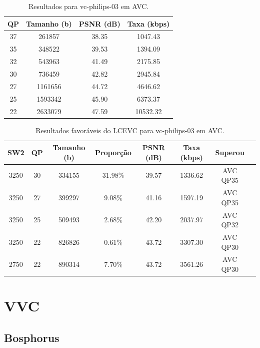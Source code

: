 \begin{table}[h]
    \centering
    \begin{tabular}{|c|c|c|c|}
        \hline
        \textbf{QP} & \textbf{Tamanho (b)} & \textbf{PSNR (dB)} & \textbf{Taxa (kbps)} \\
        \hline
        37 & 261857 & 38.35 & 1047.43 \\
        35 & 348522 & 39.53 & 1394.09 \\
        32 & 543963 & 41.49 & 2175.85 \\
        30 & 736459 & 42.82 & 2945.84 \\
        27 & 1161656 & 44.72 & 4646.62 \\
        25 & 1593342 & 45.90 & 6373.37 \\
        22 & 2633079 & 47.59 & 10532.32 \\
        \hline
    \end{tabular}
    \caption{Resultados para vc-philips-03 em AVC.}
    \label{tab:vc-philips-03-avc}
\end{table}

\newpage
\begin{table}[h]
    \centering
    \label{tab:vc-philips-03-avc-philips}
    \begin{tabular}{|c|c|c|c|c|c|c|c|}
        \hline
        \textbf{SW2} & \textbf{QP} & \textbf{Tamanho (b)} & \textbf{Proporção} & \textbf{PSNR (dB)} & \textbf{Taxa (kbps)} & \textbf{Superou} \\
        \hline
        3250 & 30 & 334155 & 31.98\% & 39.57 & 1336.62 & AVC QP35 \\
        3250 & 27 & 399297 & 9.08\% & 41.16 & 1597.19 & AVC QP35 \\
        3250 & 25 & 509493 & 2.68\% & 42.20 & 2037.97 & AVC QP32 \\
        3250 & 22 & 826826 & 0.61\% & 43.72 & 3307.30 & AVC QP30 \\
        2750 & 22 & 890314 & 7.70\% & 43.72 & 3561.26 & AVC QP30 \\
        \hline
    \end{tabular}
    \caption{Resultados favoráveis do LCEVC para vc-philips-03 em AVC.}
\end{table}

\newpage
\section{VVC}

\subsection{Bosphorus}

